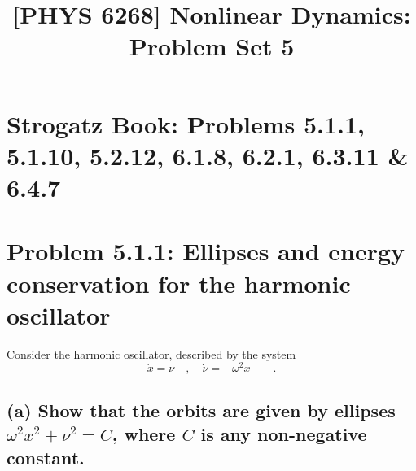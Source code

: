 \documentclass[draft]{agujournal2019}
\begin{document}
\SetSinglespace{}
\title{[PHYS 6268] Nonlinear Dynamics: Problem Set 5}




\section*{Strogatz Book: Problems 5.1.1, 5.1.10, 5.2.12, 6.1.8, 6.2.1, 6.3.11 \& 6.4.7}


\newcommand{\Det}[1]{\mathrm{det}\,\mathbb{#1}}
\newcommand{\tra}[1]{\mathrm{Tr}\,\mathbb{#1}}



\section{Problem 5.1.1: Ellipses and energy conservation for the harmonic oscillator}
\label{sec:p1}
Consider the harmonic oscillator, described by the system
\begin{equation*}
    \dot x = \nu \quad , \quad \dot \nu = -\omega^2 x \qquad .
\end{equation*}


\subsection{(a) Show that the orbits are given by ellipses $\omega^2x^2 + \nu^2 = C$, where $C$ is any
non-negative constant.}
\label{ssec:p1a}
\end{document}
